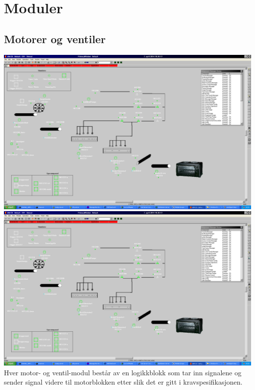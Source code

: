 \section{Moduler}
\subsection{Motorer og ventiler}
	\includegraphics{motmod.jpg}
	\includegraphics{ventmod.jpg}
	Hver motor- og ventil-modul består av en logikkblokk som tar inn signalene og sender signal videre til motorblokken etter slik det er gitt i kravspesifikasjonen.

